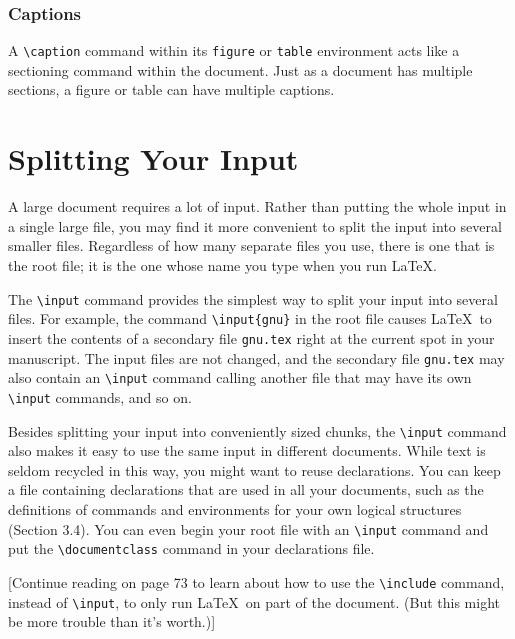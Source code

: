 \documentclass{article}
\newcommand{\justtext}[1]{\texttt{\textbackslash #1}}
\begin{document}
\subsubsection{Captions} 

A \justtext{caption} command within its {\tt figure} or {\tt table} environment acts like a
sectioning command within the document. Just as a document has multiple sections, a figure or table
can have multiple captions.



\section{Splitting Your Input}

A large document requires a lot of input. Rather than putting the whole input in a single large
file, you may find it more convenient to split the input into several smaller files. Regardless of
how many separate files you use, there is one that is the root file; it is the one whose name you
type when you run \LaTeX.

The \justtext{input} command provides the simplest way to split your input into several files. For
example, the command \justtext{input\{gnu\}} in the root file causes \LaTeX\ to insert the contents
of a secondary file {\tt gnu.tex} right at the current spot in your manuscript. The input files are
not changed, and the secondary file {\tt gnu.tex} may also contain an \justtext{input} command
calling another file that may have its own \justtext{input} commands, and so on.

Besides splitting your input into conveniently sized chunks, the \justtext{input} command also makes
it easy to use the same input in different documents. While text is seldom recycled in this way,
you might want to reuse declarations. You can keep a file containing declarations that are used in
all your documents, such as the definitions of commands and environments for your own logical
structures (Section 3.4). You can even begin your root file with an \justtext{input} command and
put the \justtext{documentclass} command in your declarations file.

[Continue reading on page 73 to learn about how to use the \justtext{include} command, instead
of \justtext{input}, to only run \LaTeX\ on part of the document. (But this might be more trouble
than it's worth.)]
\end{document}
